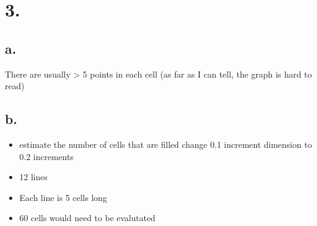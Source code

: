 \documentclass[11pt]{article}
\begin{document}
\section*{3.}
\label{sec:org75e1fa2}
\subsection*{a.}
\label{sec:org6508239}
There are usually > 5 points in each cell (as far as I can tell, the graph is
hard to read)

\subsection*{b.}
\label{sec:org859cf11}
\begin{itemize}
\item estimate the number of cells that are filled change 0.1 increment dimension to
0.2 increments
\item 12 lines
\item Each line is 5 cells long
\item 60 cells would need to be evalutated
\end{itemize}
\end{document}
